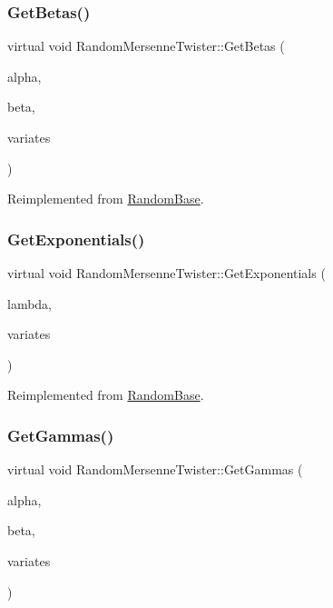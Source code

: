 \subsubsection{\texorpdfstring{Get\+Betas()}{GetBetas()}}
{\footnotesize\ttfamily virtual void Random\+Mersenne\+Twister\+::\+Get\+Betas (\begin{DoxyParamCaption}\item[{double}]{alpha,  }\item[{double}]{beta,  }\item[{\hyperlink{classMJArray}{M\+J\+Array} \&}]{variates }\end{DoxyParamCaption})\hspace{0.3cm}{\ttfamily [virtual]}}



Reimplemented from \hyperlink{classRandomBase_aa3f3efa1333ab5d7689b8cc7ebd26622}{Random\+Base}.

\hypertarget{classRandomMersenneTwister_add67fcdb019b8f0eb43c50d3cdf1f8c1}{}\label{classRandomMersenneTwister_add67fcdb019b8f0eb43c50d3cdf1f8c1} 
\subsubsection{\texorpdfstring{Get\+Exponentials()}{GetExponentials()}}
{\footnotesize\ttfamily virtual void Random\+Mersenne\+Twister\+::\+Get\+Exponentials (\begin{DoxyParamCaption}\item[{double}]{lambda,  }\item[{\hyperlink{classMJArray}{M\+J\+Array} \&}]{variates }\end{DoxyParamCaption})\hspace{0.3cm}{\ttfamily [virtual]}}



Reimplemented from \hyperlink{classRandomBase_ad1d2c39a8440f67cffda3ad41a4f9975}{Random\+Base}.

\hypertarget{classRandomMersenneTwister_a6bc8dbc22f258488161f800580574c0f}{}\label{classRandomMersenneTwister_a6bc8dbc22f258488161f800580574c0f} 
\subsubsection{\texorpdfstring{Get\+Gammas()}{GetGammas()}}
{\footnotesize\ttfamily virtual void Random\+Mersenne\+Twister\+::\+Get\+Gammas (\begin{DoxyParamCaption}\item[{double}]{alpha,  }\item[{double}]{beta,  }\item[{\hyperlink{classMJArray}{M\+J\+Array} \&}]{variates }\end{DoxyParamCaption})\hspace{0.3cm}{\ttfamily [virtual]}}



